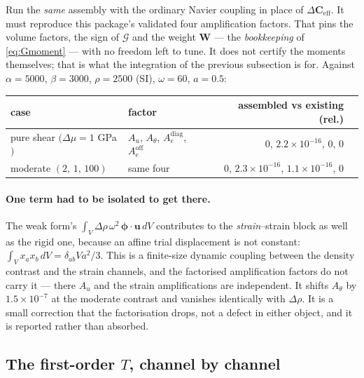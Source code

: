 \documentclass[11pt,a4paper]{article}
\newcommand{\bW}{\mathbf{W}}
\newcommand{\bu}{\mathbf{u}}
\newcommand{\dCeff}{\Delta\mathbf{C}_{\mathrm{eff}}}
\begin{document}
Run the \emph{same} assembly with the ordinary Navier coupling in place of
$\dCeff$.  It must reproduce this package's validated four amplification
factors.  That pins the volume factors, the sign of $\mathcal{G}$ and the
weight $\bW$ --- the \emph{bookkeeping} of \eqref{eq:Gmoment} --- with no
freedom left to tune.  It does not certify the moments themselves; that is what
the integration of the previous subsection is for.  Against
$\alpha = 5000$, $\beta = 3000$, $\rho = 2500$ (SI), $\omega = 60$, $a = 0.5$:

\begin{center}
\begin{tabular}{llrr}
\toprule
case & factor & assembled vs existing (rel.) \\
\midrule
pure shear $(\Delta\mu = 1$ GPa$)$ & $A_u$, $A_\theta$, $A_e^{\text{diag}}$, $A_e^{\text{off}}$
  & $0$, $2.2\times10^{-16}$, $0$, $0$\\
moderate $(2,\,1,\,100)$ & same four
  & $0$, $2.3\times10^{-16}$, $1.1\times10^{-16}$, $0$\\
\bottomrule
\end{tabular}
\end{center}

\paragraph{One term had to be isolated to get there.}  The weak form's
$\int_V\Delta\rho\,\omega^2\,\boldsymbol\phi\cdot\bu\,dV$ contributes to the
\emph{strain}--strain block as well as the rigid one, because an affine trial
displacement is not constant: $\int_V x_ax_b\,dV = \delta_{ab}Va^2/3$.  This is
a finite-size dynamic coupling between the density contrast and the strain
channels, and the factorised amplification factors do not carry it --- there
$A_u$ and the strain amplifications are independent.  It shifts $A_\theta$ by
$1.5\times10^{-7}$ at the moderate contrast and vanishes identically with
$\Delta\rho$.  It is a small correction that the factorisation drops, not a
defect in either object, and it is reported rather than absorbed.

\subsection{The first-order \texorpdfstring{$T$}{T}, channel by channel}
\end{document}
